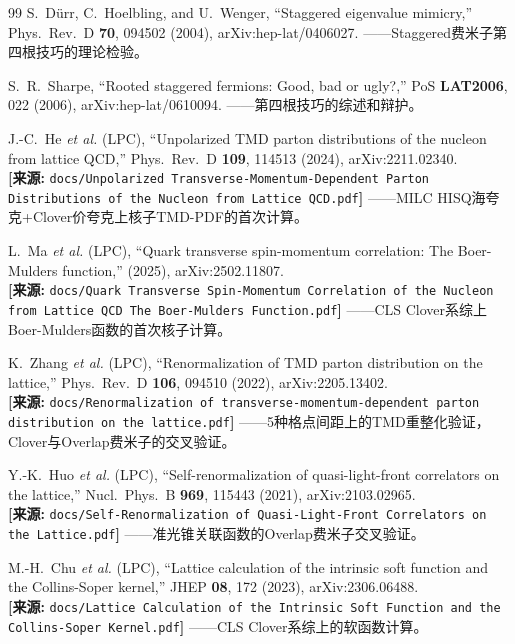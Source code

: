 \documentclass[12pt,a4paper]{ctexart}
\theoremstyle{definition}
\begin{document}
\begin{thebibliography}{99}
S.~D\"urr, C.~Hoelbling, and U.~Wenger,
``Staggered eigenvalue mimicry,''
Phys.\ Rev.\ D \textbf{70}, 094502 (2004), arXiv:hep-lat/0406027.
——Staggered费米子第四根技巧的理论检验。

S.~R.~Sharpe,
``Rooted staggered fermions: Good, bad or ugly?,''
PoS \textbf{LAT2006}, 022 (2006), arXiv:hep-lat/0610094.
——第四根技巧的综述和辩护。

J.-C.~He \textit{et al.} (LPC),
``Unpolarized TMD parton distributions of the nucleon from lattice QCD,''
Phys.\ Rev.\ D \textbf{109}, 114513 (2024), arXiv:2211.02340.
\\\textbf{[来源:} \texttt{docs/Unpolarized Transverse-Momentum-Dependent Parton Distributions of the Nucleon from Lattice QCD.pdf}\textbf{]}
——MILC HISQ海夸克+Clover价夸克上核子TMD-PDF的首次计算。

L.~Ma \textit{et al.} (LPC),
``Quark transverse spin-momentum correlation: The Boer-Mulders function,''
(2025), arXiv:2502.11807.
\\\textbf{[来源:} \texttt{docs/Quark Transverse Spin-Momentum Correlation of the Nucleon from Lattice QCD The Boer-Mulders Function.pdf}\textbf{]}
——CLS Clover系综上Boer-Mulders函数的首次核子计算。

K.~Zhang \textit{et al.} (LPC),
``Renormalization of TMD parton distribution on the lattice,''
Phys.\ Rev.\ D \textbf{106}, 094510 (2022), arXiv:2205.13402.
\\\textbf{[来源:} \texttt{docs/Renormalization of transverse-momentum-dependent parton distribution on the lattice.pdf}\textbf{]}
——5种格点间距上的TMD重整化验证，Clover与Overlap费米子的交叉验证。

Y.-K.~Huo \textit{et al.} (LPC),
``Self-renormalization of quasi-light-front correlators on the lattice,''
Nucl.\ Phys.\ B \textbf{969}, 115443 (2021), arXiv:2103.02965.
\\\textbf{[来源:} \texttt{docs/Self-Renormalization of Quasi-Light-Front Correlators on the Lattice.pdf}\textbf{]}
——准光锥关联函数的Overlap费米子交叉验证。

M.-H.~Chu \textit{et al.} (LPC),
``Lattice calculation of the intrinsic soft function and the Collins-Soper kernel,''
JHEP \textbf{08}, 172 (2023), arXiv:2306.06488.
\\\textbf{[来源:} \texttt{docs/Lattice Calculation of the Intrinsic Soft Function and the Collins-Soper Kernel.pdf}\textbf{]}
——CLS Clover系综上的软函数计算。


\end{thebibliography}
\end{document}
